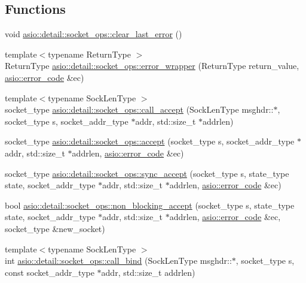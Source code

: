 \subsection*{Functions}
\begin{DoxyCompactItemize}
\item 
void \hyperlink{namespaceasio_1_1detail_1_1socket__ops_ab9ae8eefacd1c7fb7014e3e29db85412}{asio\+::detail\+::socket\+\_\+ops\+::clear\+\_\+last\+\_\+error} ()
\item 
{\footnotesize template$<$typename Return\+Type $>$ }\\Return\+Type \hyperlink{namespaceasio_1_1detail_1_1socket__ops_a57ec49ce75c53385935f63875b3d4eaa}{asio\+::detail\+::socket\+\_\+ops\+::error\+\_\+wrapper} (Return\+Type return\+\_\+value, \hyperlink{classasio_1_1error__code}{asio\+::error\+\_\+code} \&ec)
\item 
{\footnotesize template$<$typename Sock\+Len\+Type $>$ }\\socket\+\_\+type \hyperlink{namespaceasio_1_1detail_1_1socket__ops_a92387ebc5f29671a79e3606f505ae8f7}{asio\+::detail\+::socket\+\_\+ops\+::call\+\_\+accept} (Sock\+Len\+Type msghdr\+::$\ast$, socket\+\_\+type s, socket\+\_\+addr\+\_\+type $\ast$addr, std\+::size\+\_\+t $\ast$addrlen)
\item 
socket\+\_\+type \hyperlink{namespaceasio_1_1detail_1_1socket__ops_aeb0907d9c536f6d228d789c6fb44c1b2}{asio\+::detail\+::socket\+\_\+ops\+::accept} (socket\+\_\+type s, socket\+\_\+addr\+\_\+type $\ast$addr, std\+::size\+\_\+t $\ast$addrlen, \hyperlink{classasio_1_1error__code}{asio\+::error\+\_\+code} \&ec)
\item 
socket\+\_\+type \hyperlink{namespaceasio_1_1detail_1_1socket__ops_ad31b02360f4c25736aea67c3e8f98663}{asio\+::detail\+::socket\+\_\+ops\+::sync\+\_\+accept} (socket\+\_\+type s, state\+\_\+type state, socket\+\_\+addr\+\_\+type $\ast$addr, std\+::size\+\_\+t $\ast$addrlen, \hyperlink{classasio_1_1error__code}{asio\+::error\+\_\+code} \&ec)
\item 
bool \hyperlink{namespaceasio_1_1detail_1_1socket__ops_ae084d56810896cc9edafc565e48512dd}{asio\+::detail\+::socket\+\_\+ops\+::non\+\_\+blocking\+\_\+accept} (socket\+\_\+type s, state\+\_\+type state, socket\+\_\+addr\+\_\+type $\ast$addr, std\+::size\+\_\+t $\ast$addrlen, \hyperlink{classasio_1_1error__code}{asio\+::error\+\_\+code} \&ec, socket\+\_\+type \&new\+\_\+socket)
\item 
{\footnotesize template$<$typename Sock\+Len\+Type $>$ }\\int \hyperlink{namespaceasio_1_1detail_1_1socket__ops_a802999f3be708c6e3e99c4c39a6148a7}{asio\+::detail\+::socket\+\_\+ops\+::call\+\_\+bind} (Sock\+Len\+Type msghdr\+::$\ast$, socket\+\_\+type s, const socket\+\_\+addr\+\_\+type $\ast$addr, std\+::size\+\_\+t addrlen)

\end{DoxyCompactItemize}

